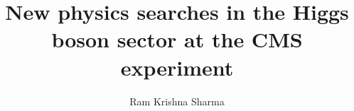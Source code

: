 \documentclass[11pt,a4paper]{postdoc_temp}
\author{Ram Krishna Sharma}
\title{New physics searches in the Higgs boson sector at the CMS experiment}
\begin{document}
\listoftodos

% 

















\appendix

\end{document}

